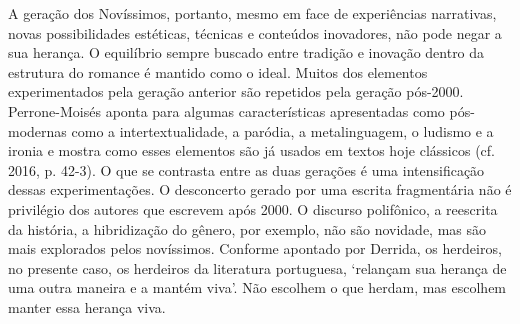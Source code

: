 \documentclass[../DISSERTACAO_MAIN.tex]{subfiles}
\begin{document}
A geração dos Novíssimos, portanto, mesmo em face de experiências narrativas, novas possibilidades estéticas, técnicas e conteúdos inovadores, não pode negar a sua herança. O equilíbrio sempre buscado entre tradição e inovação dentro da estrutura do romance é mantido como o ideal. Muitos dos elementos experimentados pela geração anterior são repetidos pela geração pós-2000. Perrone-Moisés aponta para algumas características apresentadas como pós-modernas como a intertextualidade, a paródia, a metalinguagem, o ludismo e a ironia e mostra como esses elementos são já usados em textos hoje clássicos (cf. 2016, p. 42-3). O que se contrasta entre as duas gerações é uma intensificação dessas experimentações. O desconcerto gerado por uma escrita fragmentária não é privilégio dos autores que escrevem após 2000. O discurso polifônico, a reescrita da história, a hibridização do gênero, por exemplo, não são novidade, mas são mais explorados pelos novíssimos. Conforme apontado por Derrida, os herdeiros, no presente caso, os herdeiros da literatura portuguesa, ‘relançam sua herança de uma outra maneira e a mantém viva’. Não escolhem o que herdam, mas escolhem manter essa herança viva. 


\end{document}
